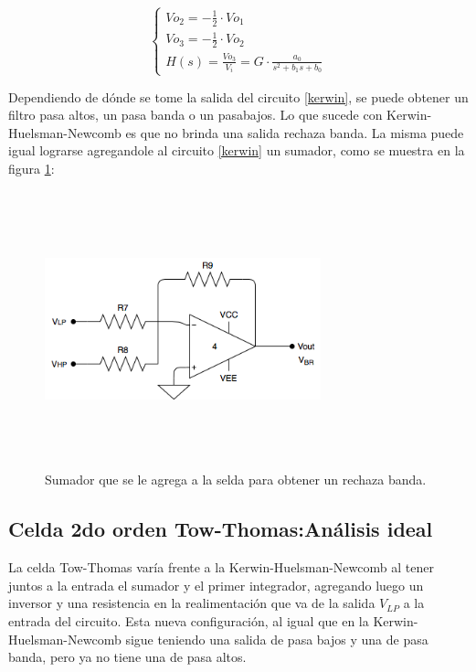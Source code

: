 \begin{equation}
\begin{cases}
Vo_2 = -\frac{1}{2} \cdot Vo_1\\
Vo_3 = -\frac{1}{2} \cdot Vo_2\\
H(s) = \frac{Vo_3}{V_i} = G \cdot \frac{a_0}{s^2 + b_1 s + b_0}
\label{int2eq}
\end{cases}
\end{equation}

Dependiendo de d\'onde se tome la salida del circuito \ref{kerwin}, se puede obtener un filtro pasa altos, un pasa banda o un pasabajos. Lo que sucede con Kerwin-Huelsman-Newcomb es que no brinda una salida rechaza banda. La misma puede igual lograrse agregandole al circuito \ref{kerwin} un sumador, como se muestra en la figura \ref{sumador_extra}:

\begin{figure}[H] %
	\centering
	\includegraphics[width=8cm,height=8cm,keepaspectratio]{../EJ4/imagenes/sumador_extra.png}
	\caption{Sumador que se le agrega a la selda para obtener un rechaza banda.}
	\label{sumador_extra}
\end{figure}

\subsection{Celda 2do orden Tow-Thomas:An\'alisis ideal}

La celda Tow-Thomas var\'ia frente a la Kerwin-Huelsman-Newcomb al tener juntos a la entrada el sumador y el primer integrador, agregando luego un inversor y una resistencia en la realimentación que va de la salida $V_{LP}$ a la entrada del circuito. Esta nueva configuraci\'on, al igual que en la Kerwin-Huelsman-Newcomb sigue teniendo una salida de pasa bajos y una de pasa banda, pero ya no tiene una de pasa altos. 

